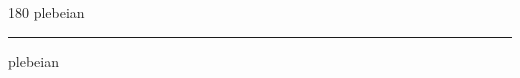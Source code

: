 
\begin{frame}
\begin{center}
\begin{turn}{180}
{\fontsize{2.5cm}{1em}\selectfont plebeian}
\end{turn}
\vspace{1em}\par  
\hrule
\vspace{1em}\par  
{\fontsize{2.5cm}{1em}\selectfont plebeian}
\end{center}
\end{frame}
